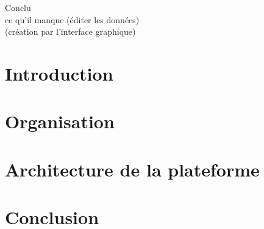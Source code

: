 \documentclass[a4paper]{report}
\begin{document}



\tableofcontents

	Conclu\\
		ce qu'il manque (éditer les données)\\
		(création par l'interface graphique)

	
\chapter*{Introduction}



\chapter{Organisation}

	

\chapter{Architecture de la plateforme}



\chapter*{Conclusion}
%
\end{document}
